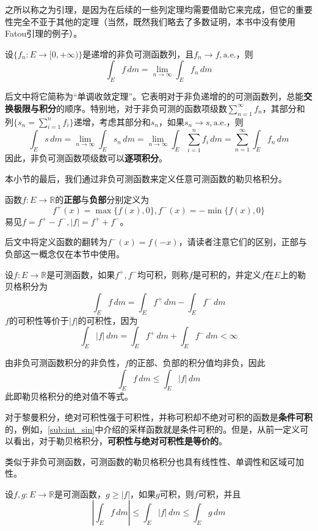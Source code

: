 \documentclass{ctexbook}
\begin{document}
之所以称之为引理，是因为在后续的一些列定理均需要借助它来完成，但它的重要性完全不亚于其他的定理（当然，既然我们略去了多数证明，本书中没有使用Fatou引理的例子）。

\begin{theorem}[Levi单调收敛定理]
    设$\{f_n:E\to[0,+\infty)\}$是递增的非负可测函数列，且$f_n\to f,\text{a.e.}$，则
    \[\int_{E}f\,dm=\lim_{n\to\infty}\int_{E}f_n\,dm\]
\end{theorem}
后文中将它简称为“单调收敛定理”。它表明对于非负递增的的可测函数列，总能\textbf{交换极限与积分}的顺序。特别地，对于非负可测的函数项级数$\sum_{n=1}^{\infty}f_n$，其部分和列$\{s_n=\sum_{i=1}^{n}f_i\}$递增，考虑其部分和$s_n$，如果$s_n\to s,\text{a.e.}$，则
\[\int_{E}s\,dm=\lim_{n\to\infty}\int_{E}s_n\,dm=\lim_{n\to\infty}\int_{E}\sum_{i=1}^{n}f_i\,dm=\sum_{n=1}^{\infty}\int_{E}f_n\,dm\]
因此，非负可测函数项级数可以\textbf{逐项积分}。

本小节的最后，我们通过非负可测函数来定义任意可测函数的勒贝格积分。

\begin{definition}[函数的正部与负部]
    函数$f:E\to\mathbb{R}$的\textbf{正部}与\textbf{负部}分别定义为$$f^+(x)=\max\{f(x),0\},f^-(x)=-\min\{f(x),0\}$$
    易见$f=f^+-f^-,|f|=f^++f^-$。
\end{definition}
后文中将定义函数的翻转为$f^-(x)=f(-x)$，请读者注意它们的区别，正部与负部这一概念仅在本节中使用。

\begin{definition}[可测函数的勒贝格积分]
    设$f:E\to\mathbb{R}$是可测函数，如果$f^+,f^-$均可积，则称$f$是可积的，并定义$f$在$E$上的勒贝格积分为
    \[\int_{E}f\,dm=\int_{E}f^+\,dm-\int_{E}f^-\,dm\]
    $f$的可积性等价于$|f|$的可积性，因为
    \[\int_{E}|f|\,dm=\int_{E}f^+\,dm+\int_{E}f^-\,dm<\infty\]
\end{definition}

由非负可测函数积分的非负性，$f$的正部、负部的积分值均非负，因此
\[\int_{E}f\,dm\leq \int_{E}|f|\,dm\]
此即勒贝格积分的绝对值不等式。

对于黎曼积分，绝对可积性强于可积性，并称可积却不绝对可积的函数是\textbf{条件可积}的，例如，\ref{sub:int_sin}中介绍的采样函数就是条件可积的。但是，从前一定义可以看出，对于勒贝格积分，\textbf{可积性与绝对可积性是等价的}。

类似于非负可测函数，可测函数的勒贝格积分也具有线性性、单调性和区域可加性。

\begin{theorem}[比较判别法]
    设$f,g:E\to\mathbb{R}$是可测函数，$g\geq|f|$，如果$g$可积，则$f$可积，并且
    \[\left|\int_{E}f\,dm\right|\leq \int_{E}|f|\,dm\leq \int_{E}g\,dm\]
\end{theorem}
\end{document}
